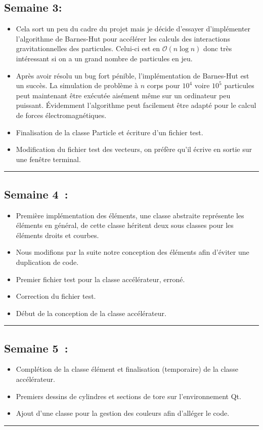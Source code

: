 \documentclass[12pt, letterpaper, twoside]{article}
\begin{document}
\subsection{Semaine 3:}
\begin{itemize}
\item Cela sort un peu du cadre du projet mais je décide d'essayer d'implémenter l'algorithme de Barnes-Hut pour accélérer les calculs des interactions gravitationnelles des particules. Celui-ci est en  $\mathcal{O}(n\log{n})$ donc très intéressant si on a un grand nombre de particules en jeu.

\item Après avoir résolu un bug fort pénible, l'implémentation de Barnes-Hut est un succès. La simulation de problème à $n$ corps pour $10^4$ voire $10^5$ particules peut maintenant être exécutée aisément même sur un ordinateur peu puissant. Évidemment l'algorithme peut facilement être adapté pour le calcul de forces électromagnétiques.

\item Finalisation de la classe Particle et écriture d'un fichier test.
\item Modification du fichier test des vecteurs, on préfère qu'il écrive en sortie sur une fenêtre terminal.
\end{itemize}

\rule{\textwidth}{0.4pt}

\subsection{Semaine 4 :}

\begin{itemize}
\item Première implémentation des éléments, une classe abstraite représente les éléments en général, de cette classe héritent deux sous classes pour les éléments droits et courbes.
\item Nous modifions par la suite notre conception des éléments afin d'éviter une duplication de code.
\item Premier fichier test pour la classe accélérateur, erroné.
\item Correction du fichier test.
\item Début de la conception de la classe accélérateur.
\end{itemize}

\rule{\textwidth}{0.4pt}

\subsection{Semaine 5 :}
\begin{itemize}
\item Complétion de la classe élément et finalisation (temporaire) de la classe accélérateur.
\item Premiers dessins de cylindres et sections de tore sur l’environnement Qt.
\item Ajout d’une classe pour la gestion des couleurs afin d’alléger le code.
\end{itemize}
\rule{\textwidth}{0.4pt}
\end{document}
